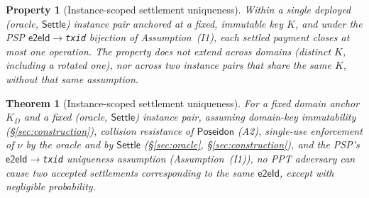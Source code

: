 \documentclass[11pt]{article}
\newtheorem{property}{Property}
\newtheorem{theorem}{Theorem}
\newcommand{\Poseidon}{\ensuremath{\mathsf{Poseidon}}}
\newcommand{\eeid}{\ensuremath{\mathsf{e2eId}}}
\newcommand{\code}[1]{\texttt{#1}}
\begin{document}
\begin{property}[Instance-scoped settlement uniqueness]
\label{prop:uniqueness}
Within a single deployed (oracle, $\mathsf{Settle}$) instance pair anchored at a
fixed, immutable key $K$, and under the PSP \eeid{}$\to$\code{txid} bijection of
Assumption~(I1), each settled payment closes at most one operation. The property
does not extend across domains (distinct $K$, including a rotated one), nor
across two instance pairs that share the same $K$, without that same assumption.
\end{property}

\begin{theorem}[Instance-scoped settlement uniqueness]
\label{thm:uniqueness}
For a fixed domain anchor $K_D$ and a fixed (oracle, $\mathsf{Settle}$) instance
pair, assuming domain-key immutability
(\S\ref{sec:construction}), collision resistance of $\Poseidon$ (A2),
single-use enforcement of $\nu$ by the oracle and by $\mathsf{Settle}$
(\S\ref{sec:oracle}, \S\ref{sec:construction}), and the PSP's
\eeid{}$\to$\code{txid} uniqueness assumption (Assumption~(I1)), no
PPT adversary can cause two accepted settlements corresponding to the same
\eeid{}, except with negligible probability.
\end{theorem}
\end{document}
